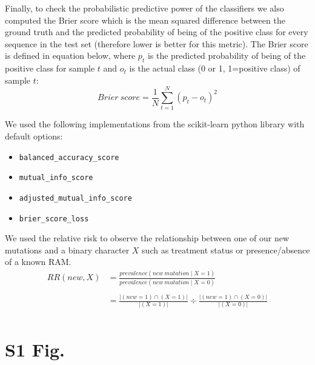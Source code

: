 \documentclass[
  11pt,
  twoside]{scrbook}
\providecommand{\tightlist}{%
  \setlength{\itemsep}{0pt}\setlength{\parskip}{0pt}}
\begin{document}
Finally, to check the probabilistic predictive power of the classifiers we also computed the Brier score which is the mean squared difference between the ground truth and the predicted probability of being of the positive class for every sequence in the test set (therefore lower is better for this metric). The Brier score is defined in equation below, where \(p_t\) is the predicted probability of being of the positive class for sample \(t\) and \(o_t\) is the actual class (0 or 1, 1=positive class) of sample \(t\):\\
\[Brier~score=\frac{1}{N}\sum_{t=1}^N(p_t-o_t)^2\]

We used the following implementations from the scikit-learn python library \autocite{pedregosaScikitlearnMachineLearning2011} with default options:

\begin{itemize}
\tightlist
\item
  \texttt{balanced\_accuracy\_score}
\item
  \texttt{mutual\_info\_score}
\item
  \texttt{adjusted\_mutual\_info\_score}
\item
  \texttt{brier\_score\_loss}
\end{itemize}

We used the relative risk to observe the relationship between one of our new mutations and a binary character \(X\) such as treatment status or presence/absence of a known RAM. \[
\begin{aligned}
  RR(new, X) &= \frac{prevalence\left(new~mutation\mid X=1\right)}{prevalence\left(new~mutation\mid X=0\right)} \nonumber\\
  \nonumber\\
  &= \frac{|(new=1)\cap(X=1)|}{|(X=1)|}\div\frac{|(new=1)\cap(X=0)|}{|(X=0)|} \\
  \end{aligned}
\] \newpage

\hypertarget{s1-fig.}{%
\section{S1 Fig.}\label{s1-fig.}}
\end{document}
